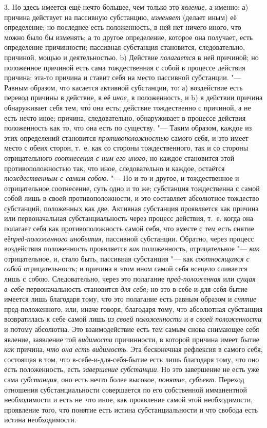 3. Но здесь имеется ещё нечто большее, чем только это {\em явление,} а именно:
а) причина действует на пассивную субстанцию, {\em изменяет} (делает
иным) её определение; но последнее есть положенность, в ней нет ничего
иного, что можно было бы изменять; а то другое определение, которое она
получает, есть определение причинности; пассивная субстанция становится,
следовательно, причиной, мощью и деятельностью. b) Действие {\em полагается}
в ней причиной; но положенное причиной есть сама тождественная с собой в
процессе действия причина; эта-то причина и ставит себя на место пассивной
субстанции. "--- Равным образом, что касается активной субстанции, то:
а) воздействие есть перевод причины в действие, в её {\em иное,} в
положенность, и b) в действии причина обнаруживает себя тем, чт\'{о} она есть;
действие тождественно с причиной, а не есть нечто иное; причина,
следовательно, обнаруживает в процессе действия положенность как то, что
она есть по существу. "--- Таким образом, каждое из этих
определений становится {\em противоположностью}
самого себя, и это имеет место с обеих сторон, т.~е. как со стороны
тождественного, так и со стороны отрицательного {\em соотнесения с ним его
иного;} но каждое становится этой противоположностью так, что иное,
следовательно и каждое, остаётся {\em тождественным с самим собою}. "--- Но и
то и другое, и тождественное и отрицательное соотнесение, суть одно и то же;
субстанция тождественна с самой собой лишь в своей противоположности, и это
составляет абсолютное тождество субстанций, положенных как две. Активная
субстанция проявляется как причина или первоначальная субстанциальность
через процесс действия, т.~е. когда она полагает себя как противоположность
самой себя, что вместе с тем есть снятие её{\em пред-положенного инобытия,}
пассивной субстанции. Обратно, через процесс воздействия положенность
проявляется {\em как} положенность, отрицательное "--- {\em как} отрицательное,
и, стало быть, пассивная субстанция "--- как {\em соотносящаяся с собой}
отрицательность; и причина в этом ином самой себя всецело сливается лишь с
собою. Следовательно, через это полагание {\em пред-положенная} или
{\em сущая в~себе} первоначальность становится {\em для себя;} но это
в-себе-и-для-себя-бытие имеется лишь благодаря тому, что это полагание есть
равным образом и {\em снятие} пред-положенного, или, иначе говоря, благодаря
тому, что абсолютная субстанция возвратилась к себе самой лишь {\em из своей
положенности} и {\em в своей положенности} и потому абсолютна. Это
взаимодействие есть тем самым снова снимающее себя явление, заявление той
{\em видимости} причинности, в которой причина имеет бытие {\em как} причина,
{\em что она есть видимость}. Эта бесконечная рефлексия в самого себя,
состоящая в том, что в-себе-и-для-себя-бытие есть лишь благодаря тому, что
оно есть положенность, есть {\em завершение субстанции}. Но это завершение
не есть уже сама {\em субстанция,} оно есть нечто более высокое, {\em понятие,}
{\em субъект}. Переход отношения субстанциальности совершается по его
собственной имманентной необходимости и есть не~что иное, как проявление
самой этой необходимости, проявление того, что понятие есть истина
субстанциальности и что свобода есть истина необходимости.

